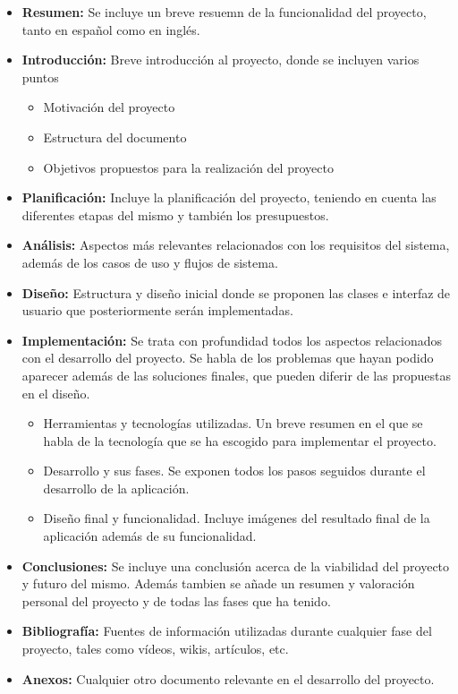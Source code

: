 \documentclass[a4paper, 12pt]{article}
\begin{document}
\begin{itemize}
\item \textbf{Resumen:} Se incluye un breve resuemn de la funcionalidad del proyecto, tanto en español como en inglés.
\item \textbf{Introducción:} Breve introducción al proyecto, donde se incluyen varios puntos
	\begin{itemize}
		\item Motivación del proyecto
		\item Estructura del documento
		\item Objetivos propuestos para la realización del proyecto
	\end {itemize}
\item \textbf{Planificación:} Incluye la planificación del proyecto, teniendo en cuenta las diferentes etapas del mismo y también los presupuestos.
\item \textbf{Análisis:} Aspectos más relevantes relacionados con los requisitos del sistema, además de los casos de uso y flujos de sistema. 
\item \textbf{Diseño:} Estructura y diseño inicial donde se proponen las clases e interfaz de usuario que posteriormente serán implementadas.
\item \textbf{Implementación:} Se trata con profundidad todos los aspectos relacionados con el desarrollo del proyecto. Se habla de los problemas que hayan podido aparecer además de las soluciones finales, que pueden diferir de las propuestas en el diseño. 
	\begin{itemize}
		\item Herramientas y tecnologías utilizadas. Un breve resumen en el que se habla de la tecnología que se ha escogido para implementar el proyecto.
		\item Desarrollo y sus fases. Se exponen todos los pasos seguidos durante el desarrollo de la aplicación.
		\item Diseño final y funcionalidad. Incluye imágenes del resultado final de la aplicación además de su funcionalidad.
	\end {itemize}
\item \textbf{Conclusiones:} Se incluye una conclusión acerca de la viabilidad del proyecto y futuro del mismo. Además tambien se añade un resumen y valoración personal del proyecto y de todas las fases que ha tenido.
\item \textbf{Bibliografía:} Fuentes de información utilizadas durante cualquier fase del proyecto, tales como vídeos, wikis, artículos, etc.
\item \textbf{Anexos:} Cualquier otro documento relevante en el desarrollo del proyecto.
\end{itemize}
\end{document}
